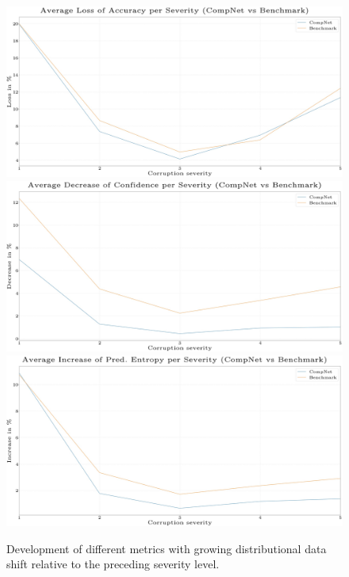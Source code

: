 \begin{figure}[htb]
    \centering
	    \includegraphics[width=\textwidth]{thesis/graphics/diagrams/uncertainty/uncertainty_compnet_benchmark_ds_cat_acc_loss_print.jpg}
	    \includegraphics[width=\textwidth]{thesis/graphics/diagrams/uncertainty/uncertainty_compnet_benchmark_ds_confidence_decrease_print.jpg}
	    \includegraphics[width=\textwidth]{thesis/graphics/diagrams/uncertainty/uncertainty_compnet_benchmark_ds_pred_ent_increase_print.jpg}
    \caption{Development of different metrics with growing distributional data shift relative to the preceding severity level.}
    \label{fig:experiments_uncertainty_results_ds_metrics_development}
\end{figure}

